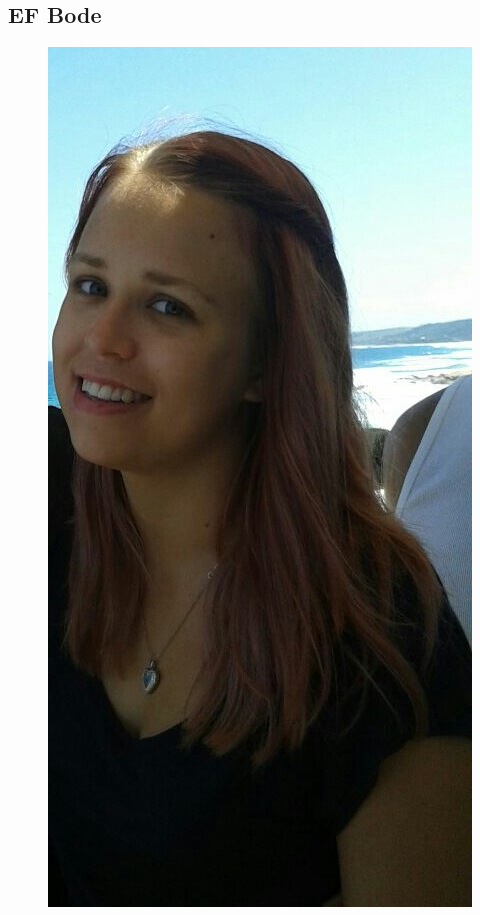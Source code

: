\documentclass{article}
\begin{document}
	\subsection{EF Bode}
	\begin{figure}[h]
		\centering
		\includegraphics[height=0.3\textheight]{../Liz.jpg}
	\end{figure}
\end{document}

